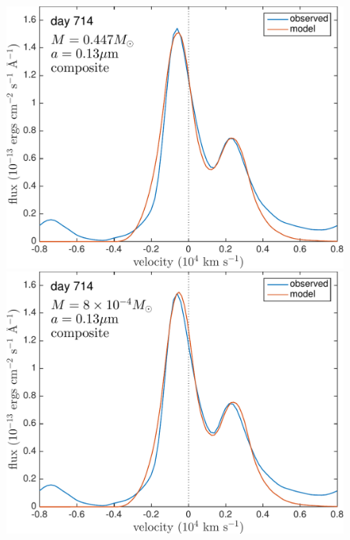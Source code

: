 \begin{figure}
\centering
\includegraphics[trim =0 20 0 0,clip=true,scale=0.33]{chapters/chapter5/images/silicates_take2/OI/composit_Dwek.pdf}
\hspace{3mm}
\includegraphics[trim =0 20 0 -25,clip=true,scale=0.33]{chapters/chapter5/images/silicates_take2/OI/composit_bestfit.pdf}


\end{figure}
